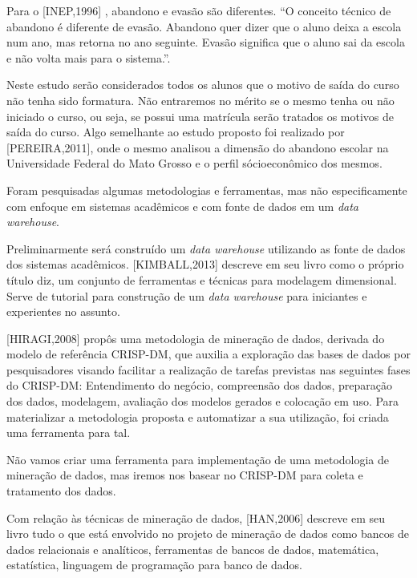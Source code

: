 Para o [INEP,1996]%
, abandono e evasão são diferentes. “O conceito técnico de abandono é diferente de evasão. Abandono quer dizer que o aluno deixa a escola num ano, mas retorna no ano seguinte. Evasão significa que o aluno sai da escola e não volta mais para o sistema.”.

Neste estudo serão considerados todos os alunos que o motivo de saída do curso não tenha sido formatura. Não entraremos no mérito se o mesmo tenha ou não iniciado o curso, ou seja, se possui uma matrícula serão tratados os motivos de saída do curso. Algo semelhante ao estudo proposto foi realizado por [PEREIRA,2011], onde o mesmo analisou a dimensão do abandono escolar na Universidade Federal do Mato Grosso e o perfil sócioeconômico dos mesmos. %

Foram pesquisadas algumas metodologias e ferramentas,  mas não especificamente com enfoque em sistemas acadêmicos e com fonte de dados em um \textit{data warehouse}. 

Preliminarmente será construído um \textit{data warehouse} utilizando as fonte de dados dos sistemas acadêmicos. [KIMBALL,2013] %
descreve em seu livro como o próprio título diz, um conjunto de  ferramentas e técnicas para modelagem dimensional. Serve de tutorial para construção de um \textit{data warehouse} para iniciantes e experientes no assunto.

[HIRAGI,2008] %
propôs uma metodologia de mineração de dados, derivada do modelo de referência CRISP-DM, que auxilia a exploração das bases de dados por pesquisadores visando facilitar a realização de tarefas previstas  nas seguintes fases do CRISP-DM: Entendimento do negócio, compreensão dos dados, preparação dos dados, modelagem, avaliação dos modelos gerados e colocação em uso.  Para materializar  a metodologia proposta e automatizar a sua utilização, foi criada uma ferramenta para tal.

Não vamos criar uma ferramenta para implementação de uma metodologia de mineração de dados, mas iremos nos basear no CRISP-DM para coleta e tratamento dos dados.

Com relação às técnicas de mineração de dados, [HAN,2006] %
descreve em seu livro  tudo o que está envolvido no projeto de mineração de dados como bancos de dados relacionais e analíticos, ferramentas de bancos de dados, matemática, estatística, linguagem de programação para banco de dados.











